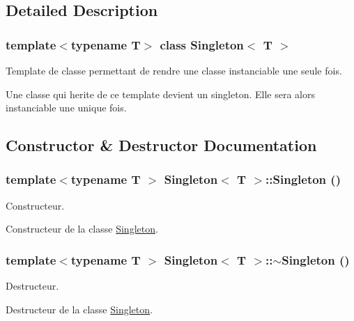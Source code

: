 \subsection{Detailed Description}
\subsubsection*{template$<$typename T$>$ class Singleton$<$ T $>$}

Template de classe permettant de rendre une classe instanciable une seule fois. 

Une classe qui herite de ce template devient un singleton. Elle sera alors instanciable une unique fois. 

\subsection{Constructor \& Destructor Documentation}
\hypertarget{classSingleton_923b995920da9c06590adb170ab2f890}{
\subsubsection[{Singleton}]{\setlength{\rightskip}{0pt plus 5cm}template$<$typename T $>$ {\bf Singleton}$<$ T $>$::{\bf Singleton} ()}}
\label{classSingleton_923b995920da9c06590adb170ab2f890}


Constructeur. 

Constructeur de la classe \hyperlink{classSingleton}{Singleton}. \hypertarget{classSingleton_c6e7af82cba33f561bd64e5e0243e7f8}{
\subsubsection[{$\sim$Singleton}]{\setlength{\rightskip}{0pt plus 5cm}template$<$typename T $>$ {\bf Singleton}$<$ T $>$::$\sim${\bf Singleton} ()}}
\label{classSingleton_c6e7af82cba33f561bd64e5e0243e7f8}


Destructeur. 

Destructeur de la classe \hyperlink{classSingleton}{Singleton}. 

